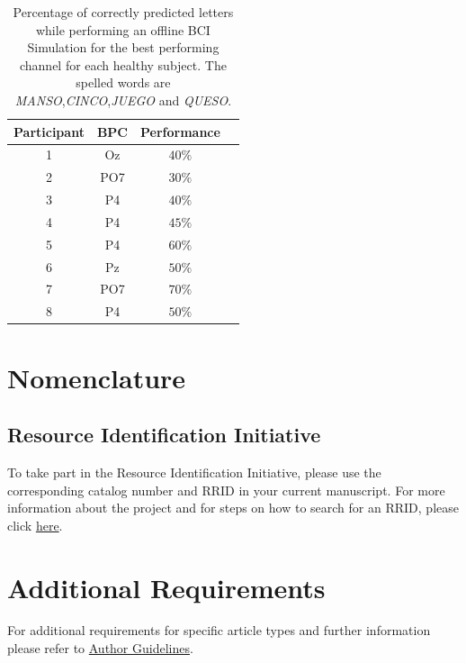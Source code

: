 \documentclass[utf8]{frontiersSCNS} %
\begin{document}
\begin{table}[htb]
\caption{Percentage of correctly predicted letters while performing an offline BCI Simulation for the best performing channel for each healthy subject. The spelled words are \textit{MANSO},\textit{CINCO},\textit{JUEGO} and \textit{QUESO}. }
\centering
\begin{tabular}{cccc}
\toprule
\textbf{Participant}	&  \textbf{BPC}	& \textbf{Performance}\\
\midrule
1     &     Oz   &     $40\%$  \\
2     &     PO7   &     $30\%$ \\
3     &     P4   &     $40\%$ \\
4     &     P4   &     $45\%$ \\
5     &     P4   &      $60\%$ \\
6     &     Pz   &      $50\%$ \\
7     &     PO7   &      $70\%$ \\
8     &     P4   &      $50\%$ \\

\end{tabular}
\label{tab:resultsowndataset}
\end{table}


\section{Nomenclature}

\subsection{Resource Identification Initiative}
To take part in the Resource Identification Initiative, please use the corresponding catalog number and RRID in your current manuscript. For more information about the project and for steps on how to search for an RRID, please click \href{http://www.frontiersin.org/files/pdf/letter_to_author.pdf}{here}.


\section{Additional Requirements}

For additional requirements for specific article types and further information please refer to \href{http://www.frontiersin.org/about/AuthorGuidelines#AdditionalRequirements}{Author Guidelines}.
\end{document}
